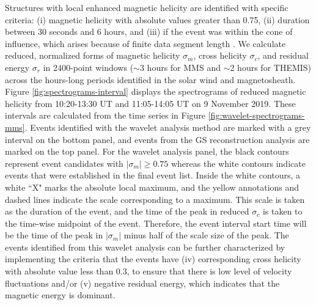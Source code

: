 Structures with local enhanced magnetic helicity are identified with specific criteria: (i) magnetic helicity with absolute values greater than 0.75, (ii) duration between 30 seconds and 6 hours, and (iii) if the event was within the cone of influence, which arises because of finite data segment length \citep{Torrence:1998}. We calculate reduced, normalized forms of magnetic helicity $\sigma_m$, cross helicity $\sigma_c$, and residual energy $\sigma_r$ in 2400-point windows ($\sim$3 hours for MMS and $\sim$2 hours for THEMIS) across the hours-long periods identified in the solar wind and magnetosheath. Figure \ref{fig:spectrograms-interval} displays the spectrograms of reduced magnetic helicity from 10:20-13:30 UT and 11:05-14:05 UT on 9 November 2019. These intervals are calculated from the time series in Figure \ref{fig:wavelet-spectrograms-mms}. Events identified with the wavelet analysis method are marked with a grey interval on the bottom panel, and events from the GS reconstruction analysis are marked on the top panel. For the wavelet analysis panel, the black contours represent event candidates with $|\sigma_m|\geq 0.75$ whereas the white contours indicate events that were established in the final event list. Inside the white contours, a white ``X" marks the absolute local maximum, and the yellow annotations and dashed lines indicate the scale corresponding to a maximum. This scale is taken as the duration of the event, and the time of the peak in reduced $\sigma_c$ is taken to the time-wise midpoint of the event. Therefore, the event interval start time will be the time of the peak in $|\sigma_m|$ minus half of the scale size of the peak. The events identified from this wavelet analysis can be further characterized by implementing the criteria that the events have (iv) corresponding cross helicity with absolute value less than 0.3, to ensure that there is low level of velocity fluctuations and/or (v) negative residual energy, which indicates that the magnetic energy is dominant.
